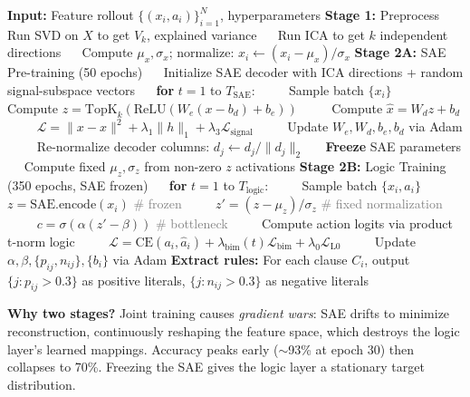 \documentclass[11pt,twocolumn]{article}
\begin{document}
\begin{algorithm}[h]
\caption{Two-Stage ARC Training}
\begin{algorithmic}[1]
\State \textbf{Input:} Feature rollout $\{(x_i, a_i)\}_{i=1}^N$, hyperparameters
\State \textbf{Stage 1:} Preprocess
\State $\quad$ Run SVD on $X$ to get $V_k$, explained variance
\State $\quad$ Run ICA to get $k$ independent directions
\State $\quad$ Compute $\mu_x, \sigma_x$; normalize: $x_i \leftarrow (x_i - \mu_x)/\sigma_x$
\State \textbf{Stage 2A:} SAE Pre-training (50 epochs)
\State $\quad$ Initialize SAE decoder with ICA directions + random signal-subspace vectors
\State $\quad$ \textbf{for} $t = 1$ to $T_\text{SAE}$:
\State $\quad\quad$ Sample batch $\{x_i\}$
\State $\quad\quad$ Compute $z = \text{TopK}_k(\text{ReLU}(W_e(x - b_d) + b_e))$
\State $\quad\quad$ Compute $\hat{x} = W_d z + b_d$
\State $\quad\quad$ $\mathcal{L} = \|x - \hat{x}\|^2 + \lambda_1 \|h\|_1 + \lambda_3 \mathcal{L}_\text{signal}$
\State $\quad\quad$ Update $W_e, W_d, b_e, b_d$ via Adam
\State $\quad\quad$ Re-normalize decoder columns: $d_j \leftarrow d_j / \|d_j\|_2$
\State $\quad$ \textbf{Freeze} SAE parameters
\State $\quad$ Compute fixed $\mu_z, \sigma_z$ from non-zero $z$ activations
\State \textbf{Stage 2B:} Logic Training (350 epochs, SAE frozen)
\State $\quad$ \textbf{for} $t = 1$ to $T_\text{logic}$:
\State $\quad\quad$ Sample batch $\{x_i, a_i\}$
\State $\quad\quad$ $z = \text{SAE.encode}(x_i)$ \textcolor{gray}{\# frozen}
\State $\quad\quad$ $z' = (z - \mu_z)/\sigma_z$ \textcolor{gray}{\# fixed normalization}
\State $\quad\quad$ $c = \sigma(\alpha(z' - \beta))$ \textcolor{gray}{\# bottleneck}
\State $\quad\quad$ Compute action logits via product t-norm logic
\State $\quad\quad$ $\mathcal{L} = \text{CE}(a_i, \hat{a}_i) + \lambda_\text{bim}(t) \mathcal{L}_\text{bim} + \lambda_0 \mathcal{L}_\text{L0}$
\State $\quad\quad$ Update $\alpha, \beta, \{p_{ij}, n_{ij}\}, \{b_i\}$ via Adam
\State \textbf{Extract rules:} For each clause $C_i$, output $\{j: p_{ij} > 0.3\}$ as positive literals, $\{j: n_{ij} > 0.3\}$ as negative literals
\end{algorithmic}
\end{algorithm}

\textbf{Why two stages?} Joint training causes \emph{gradient wars}: SAE drifts to minimize reconstruction, continuously reshaping the feature space, which destroys the logic layer's learned mappings. Accuracy peaks early ($\sim$93\% at epoch 30) then collapses to 70\%. Freezing the SAE gives the logic layer a stationary target distribution.
\end{document}
